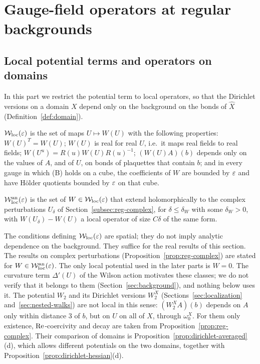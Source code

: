 \section{Gauge-field operators at regular backgrounds}\label{sec:reg-gauge}

\subsection{Local potential terms and operators on domains}\label{ss:19.1}

In this part we restrict the potential term to local operators, so that the Dirichlet versions on a domain $X$ depend only on the background on the bonds of $\hat X$ (Definition~\ref{def:domain}).

\begin{definition}\label{x:19.1}
$\mathcal W_{\rm loc}(\varepsilon)$ is the set of maps $U\mapsto W(U)$ with the following properties: $W(U)^T=W(U)$; $W(U)$ is real for real $U$, i.e.\ it maps real fields to real fields; $W(U^u)=R(u)W(U)R(u)^{-1}$; $(W(U)A)(b)$ depends only on the values of $A$, and of $U$, on bonds of plaquettes that contain $b$; and in every gauge in which (B) holds on a cube, the coefficients of $W$ are bounded by $\varepsilon$ and have H\"older quotients bounded by $\varepsilon$ on that cube.

$\mathcal W^{\rm an}_{\rm loc}(\varepsilon)$ is the set of $W\in\mathcal W_{\rm loc}(\varepsilon)$ that extend holomorphically to the complex perturbations $U_\delta$ of Section~\ref{subsec:reg-complex}, for $\delta\le\delta_W$ with some $\delta_W>0$, with $W(U_\delta)-W(U)$ a local operator of size $C\delta$ of the same form.
\end{definition}

The conditions defining $\mathcal W_{\rm loc}(\varepsilon)$ are spatial; they do not imply analytic dependence on the background. They suffice for the real results of this section. The results on complex perturbations (Proposition~\ref{prop:reg-complex}) are stated for $W\in\mathcal W^{\rm an}_{\rm loc}(\varepsilon)$. The only local potential used in the later parts is $W=0$. The curvature term $\Delta'(U)$ of the Wilson action motivates these classes; we do not verify that it belongs to them (Section~\ref{sec:background}), and nothing below uses it. The potential $W_2$ and its Dirichlet versions $W_2^X$ (Sections~\ref{sec:localization} and~\ref{sec:nested-walks}) are not local in this sense: $(W_2^XA)(b)$ depends on $A$ only within distance $3$ of $b$, but on $U$ on all of $\hat X$, through $\omega_0^X$. For them only existence, $\operatorname{Re}$-coercivity and decay are taken from Proposition~\ref{prop:reg-complex}. Their comparison of domains is Proposition~\ref{prop:dirichlet-averaged}(d), which allows different potentials on the two domains, together with Proposition~\ref{prop:dirichlet-hessian}(d).

